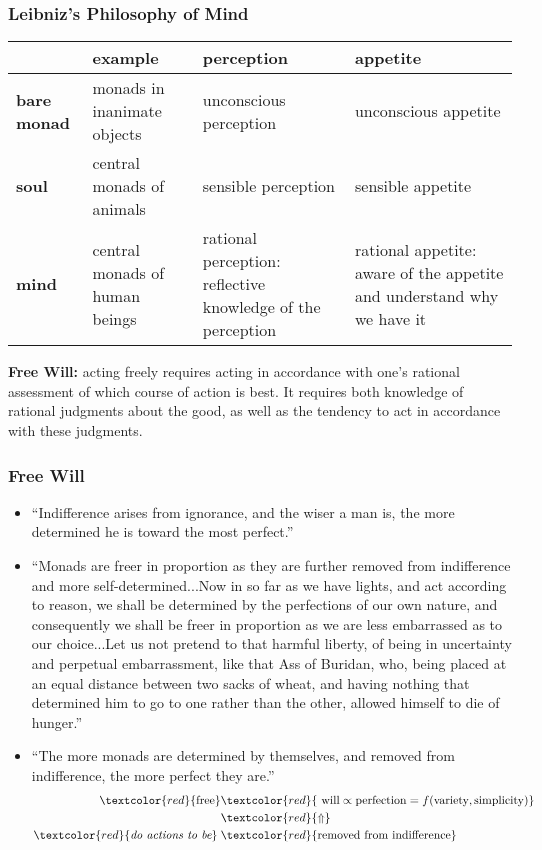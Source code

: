 \documentclass[UTF8,11pt,colorlinks,compress,openany]{beamer}%
\begin{document}
\begin{frame}\frametitle{Leibniz's Philosophy of Mind}
\begin{table}
\abovetabulinesep=1mm
\belowtabulinesep=1mm
\begin{tabu}{p{.1\textwidth}|p{.25\textwidth}|p{.25\textwidth}|p{.25\textwidth}}
\hline
 & \textbf{example} & \textbf{perception} & \textbf{appetite} \\
\hline
\textbf{bare monad} & monads in inanimate objects & unconscious perception & unconscious appetite \\
\hline
\textbf{soul} & central monads of animals & sensible perception & sensible appetite \\
\hline
\textbf{mind} & central monads of human beings & rational perception: reflective knowledge of the perception & rational appetite: aware of the appetite and understand why we have it \\
\hline
\end{tabu}
\end{table}
\textbf{Free Will:} acting freely requires acting in accordance with one's rational assessment of which course of action is best. It requires both knowledge of rational judgments about the good, as well as the tendency to act in accordance with these judgments.
\end{frame}

\begin{frame}\frametitle{Free Will}
\begin{itemize}
		\item ``Indifference arises from ignorance, and the wiser a man is, the more determined he is toward the most perfect.''
		\item ``Monads are freer in proportion as they are further removed from indifference and more self-determined...Now in so far as we have lights, and act according to reason, we shall be determined by the perfections of our own nature, and consequently we shall be freer in proportion as we are less embarrassed as to our choice...Let us not pretend to that harmful liberty, of being in uncertainty and perpetual embarrassment, like that Ass of Buridan, who, being placed at an equal distance between two sacks of wheat, and having nothing that determined him to go to one rather than the other, allowed himself to die of hunger.''
		\item ``The more monads are determined by themselves, and removed from indifference, the more perfect they are.''
\begin{align*}
\textcolor{red}{\mbox{free}} & \textcolor{red}{\mbox{ will} \propto \mbox{perfection} = f(\mbox{variety},\mbox{simplicity})}\\
&\textcolor{red}{\Uparrow} \\
\textcolor{red}{\textit{do actions to be}}\;& \textcolor{red}{\mbox{removed from indifference}}
\end{align*}
	\end{itemize}	
\end{frame}
\end{document}
